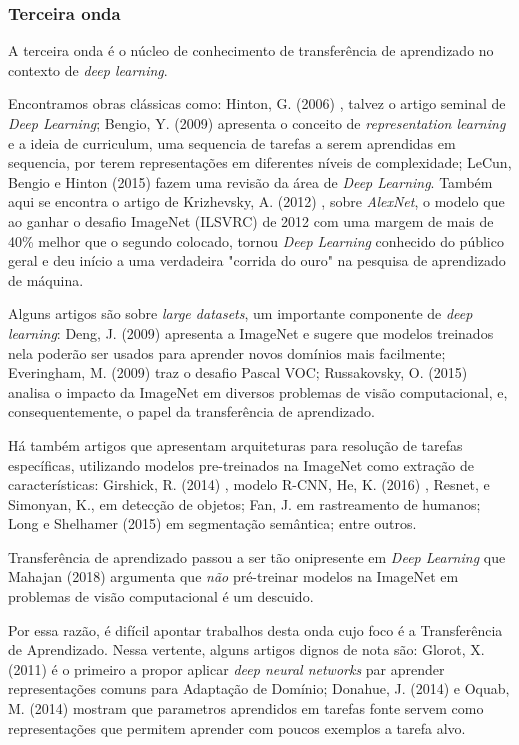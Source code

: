 \documentclass[sigconf]{acmart}
\begin{document}
\subsubsection{Terceira onda}
A terceira onda é o núcleo de conhecimento de transferência de aprendizado no contexto de \emph{deep learning}. 

Encontramos obras clássicas como: Hinton, G. (2006) \cite{Hinton2006}, talvez o artigo seminal de \emph{Deep Learning}; Bengio, Y. (2009) \cite{Bengio2009} apresenta o conceito de \emph{representation learning} e a ideia de curriculum, uma sequencia de tarefas a serem aprendidas em sequencia, por terem representações em diferentes níveis de complexidade; LeCun, Bengio e Hinton (2015)\cite{LeCun2015} fazem uma revisão da área de \emph{Deep Learning}. Também aqui se encontra o artigo de Krizhevsky, A. (2012) \cite{alexnet}, sobre \emph{AlexNet}, o modelo que ao ganhar o desafio ImageNet (ILSVRC) de 2012 com uma margem de mais de 40\% melhor que o segundo colocado, tornou \emph{Deep Learning} conhecido do público geral e deu início a uma verdadeira "corrida do ouro" na pesquisa de aprendizado de máquina. 

Alguns artigos são sobre \emph{large datasets}, um importante componente de \emph{deep learning}:  Deng, J. (2009) \cite{Deng2009} apresenta a ImageNet e sugere que modelos treinados nela poderão ser usados para aprender novos domínios mais facilmente; Everingham, M. (2009) \cite{Everingham2009} traz o desafio Pascal VOC; Russakovsky, O. (2015) \cite{Russakovsky2015} analisa o impacto da ImageNet em diversos problemas de visão computacional, e, consequentemente, o papel da transferência de aprendizado. 

Há também artigos que apresentam arquiteturas para resolução de tarefas específicas, utilizando modelos pre-treinados na ImageNet como extração de características: Girshick, R. (2014) \cite{Girshick2014}, modelo R-CNN, He, K. (2016) \cite{He2016}, Resnet, e Simonyan, K.\cite{simonyan2014very}, em detecção de objetos;  Fan, J. \cite{JialueFan2010} em rastreamento de humanos; Long e Shelhamer (2015) \cite{Long2015} em segmentação semântica; entre outros.

Transferência de aprendizado passou a ser tão onipresente em \emph{Deep Learning} que Mahajan (2018) \cite{mahajan2018exploring} argumenta que \emph{não} pré-treinar modelos na ImageNet em problemas de visão computacional é um descuido.  

Por essa razão, é difícil apontar trabalhos desta onda cujo foco é a Transferência de Aprendizado. Nessa vertente, alguns artigos dignos de nota são: Glorot, X. (2011) \cite{glorot2011domain} é o primeiro a propor aplicar \emph{deep neural networks} par aprender representações comuns para Adaptação de Domínio; Donahue, J. (2014)\cite{donahue2014decaf} e Oquab, M. (2014)\cite{Oquab:2014:LTM:2679600.2680210} mostram que parametros aprendidos em tarefas fonte servem como representações que permitem aprender com poucos exemplos a tarefa alvo.
\end{document}
